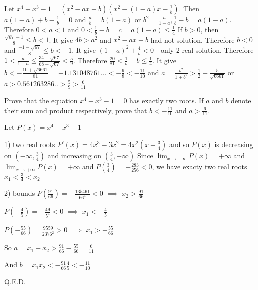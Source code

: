 \begin{solution}
	Let $ x^4-x^3-1=(x^2-ax+b)(x^2-(1-a)x-\frac 1b)$.
Then $ a(1-a)+b-\frac 1b =0$ and $ \frac ab=b(1-a)$ or 
$ b^2=\frac{a}{1-a}, \frac 1b -b=a(1-a)$. Therefore $ 0<a<1$ and $ 0<\frac 1b -b=c=a(1-a)\le\frac 14$
If $ b>0$, then $ \frac{\sqrt{67}-1}{8}\le b<1$. It give $ 4b>a^2$ and $ x^2-ax+b$ had not solution. Therefore $ b<0$ and $ \frac{-1-\sqrt{67}}{8}\le b<-1$. It give $ (1-a)^2+\frac{4}{b}<0$ - only 2 real solution.
Therefore $ 1<\frac{a}{1-a}\le \frac{34+\sqrt{67}}{68+\sqrt{67}}<\frac 59$. Therefore $ \frac{20}{81}<\frac 1b -b\le \frac 14$.
It give $ b<-\frac{10+\sqrt{6661}}{81}=-1.131048761...<-\frac 98<-\frac{11}{10}$ and $ a=\frac{b^2}{1+b^2}>\frac{1}{2}+\frac{5}{\sqrt{6661}}$ or $ a>0.561263286..>\frac 59 >\frac{6}{11}$
\end{solution}



\begin{solution}
	\begin{tcolorbox}Prove that the equation $ x^4 - x^3 - 1 = 0$ has exactly two roots. If $ a$ and $ b$ denote their sum and product respectively, prove that $ b < - \frac {11}{10}$ and $ a > \frac {6}{11}$.\end{tcolorbox}

Let $ P(x)=x^4-x^3-1$ 

1) two real roots
$ P'(x)=4x^3-3x^2=4x^2(x-\frac 34)$ and so $ P(x)$ is decreasing on $ (-\infty,\frac 34)$ and increasing on $ (\frac 34,+\infty)$
Since $ \lim_{x\to-\infty}P(x)=+\infty$ and $ \lim_{x\to+\infty}P(x)=+\infty$ and $ P(\frac 34)=-\frac{283}{256}<0$, we have exacty two real roots $ x_1<\frac 34<x_2$

2) bounds
$ P(\frac {91}{66})=-\frac{135461}{66^4}<0$ $ \implies$ $ x_2>\frac{91}{66}$

$ P(-\frac 45)=-\frac{49}{5^4}<0$ $ \implies$ $ x_1<-\frac 45$

$ P(-\frac {55}{66})=\frac{9559}{2376^2}>0$ $ \implies$ $ x_1>-\frac {55}{66}$

So $ a=x_1+x_2>\frac{91}{66}-\frac {55}{66}=\frac 6{11}$

And $ b=x_1x_2<-\frac{91}{66}\frac 45<-\frac {11}{10}$

Q.E.D.
\end{solution}



